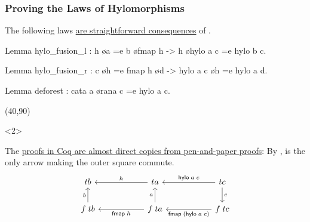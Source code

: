\begin{frame}[t,fragile]
  \frametitle{Proving the Laws of Hylomorphisms}

The following  laws \ul{are straightforward consequences} of
.
\vspace{.2cm}

  \begin{center}
  \begin{minipage}{.82\textwidth}
  \begin{bluebox}
  \begin{coqcode}
Lemma hylo_fusion_l
    : h \o a =e b \o fmap h -> h \o hylo a c =e hylo b c.

Lemma hylo_fusion_r
    : c \o h =e fmap h \o d -> hylo a c \o h =e hylo a d.

Lemma deforest : cata a \o rana c =e hylo a c.
  \end{coqcode}
  \end{bluebox}
  \end{minipage}
  \end{center}


  \Put(40,90){%
    \begin{onlyenv}<2>
    \begin{minipage}{.86\columnwidth}
      \small
    \begin{greenbox}
      The \ul{proofs in Coq are almost direct copies from pen-and-paper proofs}:
By ,  is the only arrow making the outer square
commute.
\[\begin{tikzcd}[ampersand replacement=\&, nodes={column sep=5.5em}]
	{t b} \& { ta} \& {tc} \\
	{f\; tb} \& {f\;ta} \& {f\;tc}
	\arrow["h"', from=1-2, to=1-1]
	\arrow["\mathsf{hylo}\;a\;c"', from=1-3, to=1-2]
	\arrow["c", from=1-3, to=2-3]
	\arrow["b", from=2-1, to=1-1]
	\arrow["a", from=2-2, to=1-2]
	\arrow["{\mathsf{fmap}\;h}", from=2-2, to=2-1]
	\arrow["{\mathsf{fmap}\;(\mathsf{hylo}\;a\;c)}", from=2-3, to=2-2]
\end{tikzcd}\]
    \end{greenbox}
    \end{minipage}
    \end{onlyenv}
  }

\end{frame}

